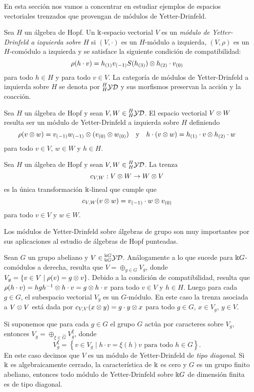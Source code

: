 \documentclass[a4paper,oneside,fleqn,11pt,../tesis.tex]{subfiles}
\newcommand{\yetter}{\prescript{H}{H}{\mathcal{YD}}}
\newcommand{\yetterg}{\prescript{\field G}{\field G}{\mathcal{YD}}}
\begin{document}
En esta sección nos vamos a concentrar en estudiar ejemplos de espacios vectoriales trenzados que provengan de módulos
de Yetter-Drinfeld.

\begin{definition}
	Sea $H$ un álgebra de Hopf. Un $\Bbbk$-espacio vectorial $V$ es un \emph{módulo de Yetter-Drinfeld a izquierda sobre $H$}
	si $\left(V, \cdot\right)$ es un $H$-módulo a izquierda, $(V, \rho)$ es un $H$-comódulo a izquierda
	y se satisface la siguiente condición de compatibilidad:
	\[
		\rho(h \cdot v) = h_{(1)}v_{(-1)}S(h_{(3)}) \otimes h_{(2)} \cdot v_{(0)}	
	\]
	para todo $h \in H$ y para todo $v \in V$.
	La categoría de módulos de Yetter-Drinfeld a izquierda sobre $H$ se denota por $\yetter$ y
	sus morfismos preservan la acción y la coacción.
\end{definition}

Sea $H$ un álgebra de Hopf y sean $V, W \in \yetter$. El espacio vectorial $V \otimes W$ resulta ser un módulo de Yetter-Drinfeld
a izquierda sobre $H$ definiendo
\[
	\rho(v \otimes w) = v_{(-1)}w_{(-1)} \otimes (v_{(0)} \otimes w_{(0)}) \quad\text{y}\quad h\cdot (v \otimes w) = h_{(1)}\cdot v \otimes h_{(2)} \cdot w
\]
para todo $v \in V$, $w \in W$ y $h \in H$.

\begin{definition}
	Sea $H$ un álgebra de Hopf y sean $V, W \in \yetter$. La trenza
	\[
		c_{V, W}: V\otimes W \to W\otimes V
	\] es la única transformación $\Bbbk$-lineal que cumple que
	\[
		c_{V, W}(v \otimes w) = v_{(-1)} \cdot w \otimes v_{(0)}
	\]
	para todo $v \in V$ y $w \in W$.
\end{definition}

Los módulos de Yetter-Drinfeld sobre álgebras de grupo son muy importantes por sus aplicaciones al estudio de álgebras de Hopf punteadas.
\begin{example}\label{examplegroupyetter}
	Sean $G$ un grupo abeliano y $V \in \yetterg$. Análogamente a lo que sucede para $\Bbbk G$-comódulos a derecha,
	resulta que $V = \oplus_{g \in G} V_g$, donde $V_g = \left\lbrace v \in V \mid \rho(v) = g \otimes v \right\rbrace$.
	Debido a la condición de compatibilidad, resulta que
	$\rho(h \cdot v) = hgh^{-1} \otimes h \cdot v = g \otimes h \cdot v$ para todo $v \in V$ y $h \in H$.
	Luego para cada $g \in G$, el subespacio vectorial $V_g$ es un $G$-módulo.
	En este caso la trenza asociada a $V \otimes V$ está dada por $c_{V, V}(x \otimes y) = g \cdot y \otimes x$ para todo $g \in G$, $x \in V_g$,
	$y \in V$.
	
	Si suponemos que para cada $g \in G$ el grupo $G$ actúa por caracteres sobre $V_g$, entonces $V_g = \oplus_{\xi \in \hat{G}} V_{g}^{\xi}$,
	donde
	\[
		V_{g}^{\xi} = \left\lbrace v \in V_g \mid h \cdot v = \xi(h)v \text{ para todo } h \in G \right\rbrace.	
	\]
	En este caso decimos que $V$ es un módulo de Yetter-Drinfeld de \emph{tipo diagonal}.
	Si $\Bbbk$ es algebraicamente cerrado, la característica de $\Bbbk$ es cero
	y $G$ es un grupo finito abeliano, entonces todo módulo de Yetter-Drinfeld sobre $\Bbbk G$ de dimensión finita es de tipo diagonal.
\end{example}
\end{document}
